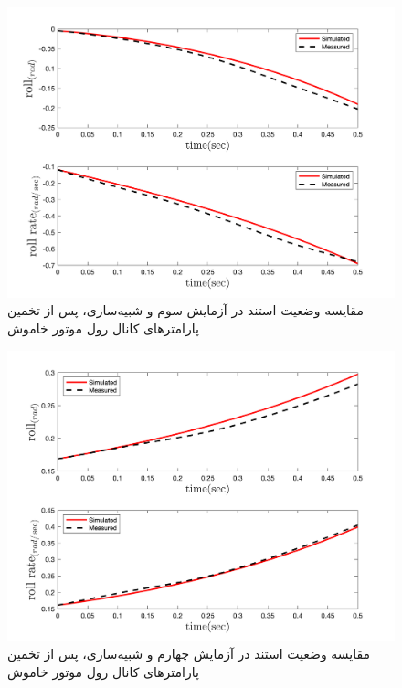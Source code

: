 \begin{figure}[H]
	\includegraphics[width=12cm]{../../Figures/RCP/roll_ml_parameter_estimation/RCP_roll_S3.png}
	\centering
	\caption{مقايسه وضعیت استند در  آزمايش سوم و شبیه‌سازی، پس از تخمین پارامترهای کانال رول موتور خاموش}
	\label{roll_ml_ps3}
\end{figure}
\begin{figure}[H]
	\includegraphics[width=12cm]{../../Figures/RCP/roll_ml_parameter_estimation/RCP_roll_S4.png}
	\centering
	\caption{مقايسه وضعیت استند در  آزمايش چهارم و شبیه‌سازی، پس از تخمین پارامترهای کانال رول موتور خاموش}
	\label{roll_ml_ps4}
\end{figure}

